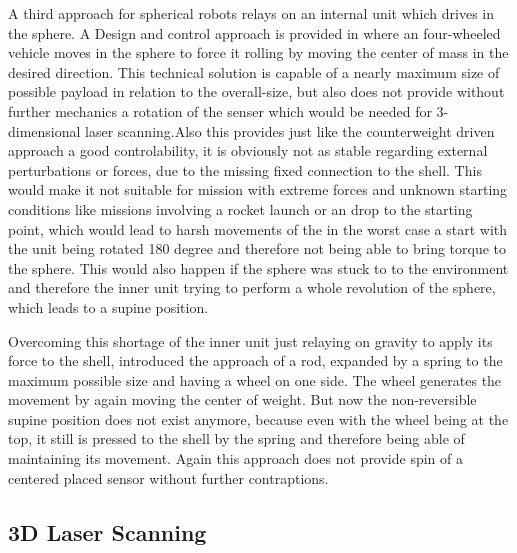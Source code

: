 A third approach for spherical robots relays on an internal unit which drives in the sphere. A Design and control approach is provided in \cite{soa6} where an four-wheeled vehicle moves in the sphere to force it rolling by moving the center of mass in the desired direction. This technical solution is capable of a nearly maximum size of possible payload in relation to the overall-size, but also does not  provide without further mechanics a rotation of the senser which would be needed for 3-dimensional laser scanning.Also this provides just like the counterweight driven approach a good controlability, it is obviously not as stable regarding external perturbations or forces, due to the missing fixed connection to the shell. This would make it not suitable for mission with extreme forces and unknown starting conditions like missions involving a rocket launch or an drop to the starting point, which would lead to harsh movements of the in the worst case a start with the unit being rotated 180 degree and therefore not being able to bring torque to the sphere. This would also happen if the sphere was stuck to to the environment and therefore the inner unit trying to perform a whole revolution of the sphere, which leads to a supine position.

Overcoming this shortage of the inner unit just relaying on gravity to apply its force to the shell, \cite{soa7} introduced the approach of a rod, expanded by a spring to the maximum possible size and having a wheel on one side. The wheel generates the movement by again moving the center of weight. But now the non-reversible supine position does not exist anymore, because even with the wheel being at the top, it still is pressed to the shell by the spring and therefore being able of maintaining its movement. Again this approach does not provide spin of a centered  placed sensor without further contraptions.



\subsection{3D Laser Scanning}
\label{sec:stateOfTheArt:3Dlaserscanning}

